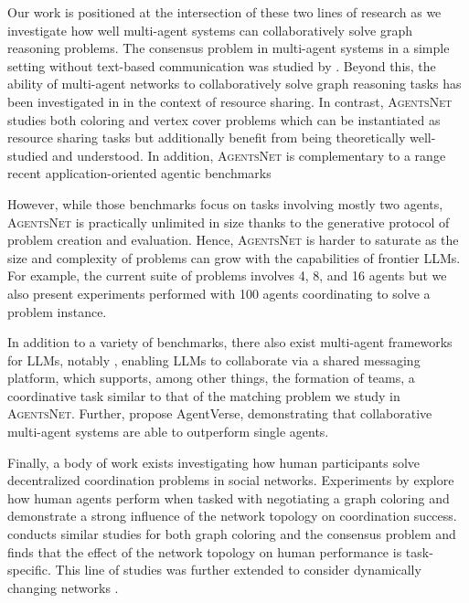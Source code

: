 \documentclass{article}
\newcommand{\benchmark}{\textsc{AgentsNet}}
\begin{document}
Our work is positioned at the intersection of these two lines of research as we investigate how well multi-agent systems can collaboratively solve graph reasoning problems.
The consensus problem in multi-agent systems in a simple setting without text-based communication was studied by \citep{chen2023multi}.
Beyond this, the ability of multi-agent networks to collaboratively solve graph reasoning tasks has been investigated in \citet{xu2023magic} in the context of resource sharing. In contrast, \benchmark{} studies both coloring and vertex cover problems which can be instantiated as resource sharing tasks but additionally benefit from being theoretically well-studied and understood.
In addition, \benchmark{} is complementary to a range recent application-oriented agentic benchmarks~\citep{liu2024agentbench,yin2024mmau,agashe2024llm,yao2024tau,ni2025coral}

However, while those benchmarks focus on tasks involving mostly two agents, \benchmark{} is practically unlimited in size thanks to the generative protocol of problem creation and evaluation. 
Hence, \benchmark{} is harder to saturate as the size and complexity of problems can grow with the capabilities of frontier LLMs. 
For example, the current suite of problems involves 4, 8, and 16 agents but we also present experiments performed 
with 100 agents coordinating to solve a problem instance. 

In addition to a variety of benchmarks, there also exist multi-agent frameworks for LLMs, notably \citet{chen2024internet}, enabling LLMs to collaborate via a shared messaging platform, which supports, among other things, the formation of teams, a coordinative task similar to that of the matching problem we study in \benchmark{}. Further, \citet{chen2024agentverse} propose AgentVerse, demonstrating that collaborative multi-agent systems are able to outperform single agents.

Finally, a body of work exists investigating how human participants solve decentralized coordination problems in social networks. 
Experiments by \citet{kearns2006experimental} explore how human agents perform when tasked with negotiating a graph coloring and demonstrate a strong influence of the network topology on coordination success. 
\citet{judd2010behavioral} conducts similar studies for both graph coloring and the consensus problem and finds that the effect of the network topology on human performance is task-specific.
This line of studies was further extended to consider dynamically changing networks \cite{chiang2024adaptive}.
\end{document}
